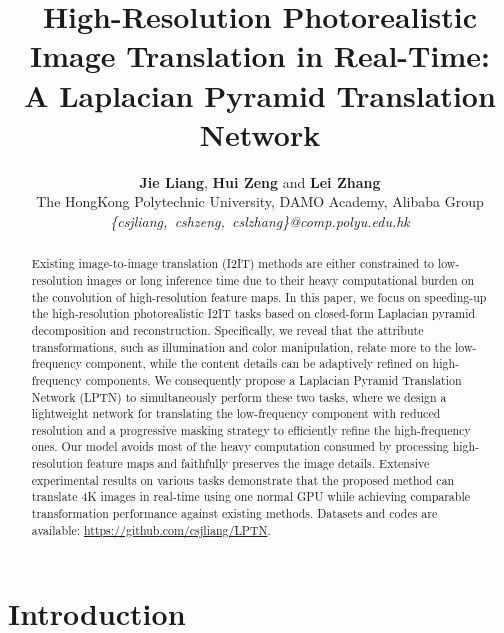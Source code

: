 \documentclass[10pt,twocolumn,letterpaper]{article}
\begin{document}
\title{High-Resolution Photorealistic Image Translation in Real-Time:\\ A Laplacian Pyramid Translation Network}

\author{\textbf{Jie Liang}\footnotemark[1],\;  \textbf{Hui Zeng}\footnotemark[1]\; and \textbf{Lei Zhang}\footnotemark[2]\\
The HongKong Polytechnic University,\;  DAMO Academy, Alibaba Group\\
\textit{\{csjliang,\, cshzeng,\, cslzhang\}@comp.polyu.edu.hk}\\
}

\maketitle

\renewcommand{\thefootnote}{\fnsymbol{footnote}}

\begin{abstract}
Existing image-to-image translation (I2IT) methods are either constrained to low-resolution images or long inference time due to their heavy computational burden on the convolution of high-resolution feature maps. In this paper, we focus on speeding-up the high-resolution photorealistic I2IT tasks based on closed-form Laplacian pyramid decomposition and reconstruction. Specifically, we reveal that the attribute transformations, such as illumination and color manipulation, relate more to the low-frequency component, while the content details can be adaptively refined on high-frequency components. We consequently propose a Laplacian Pyramid Translation Network (LPTN) to simultaneously perform these two tasks, where we design a lightweight network for translating the low-frequency component with reduced resolution and a progressive masking strategy to efficiently refine the high-frequency ones. Our model avoids most of the heavy computation consumed by processing high-resolution feature maps and faithfully preserves the image details. Extensive experimental results on various tasks demonstrate that the proposed method can translate 4K images in real-time using one normal GPU while achieving comparable transformation performance against existing methods. Datasets and codes are available: \href{https://github.com/csjliang/LPTN}{https://github.com/csjliang/LPTN}.
\end{abstract}

\section{Introduction}
	
\end{document}
